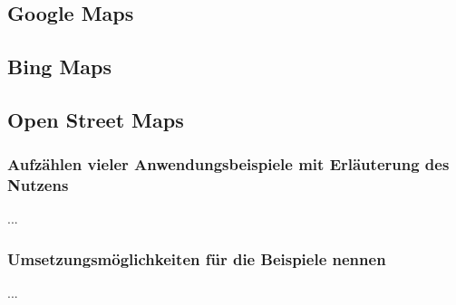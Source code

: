 \subsection{Google Maps}

\subsection{Bing Maps}

\subsection{Open Street Maps}


	\subsubsection{Aufzählen vieler Anwendungsbeispiele mit Erläuterung des Nutzens}
...
	\subsubsection{Umsetzungsmöglichkeiten für die Beispiele nennen}
...